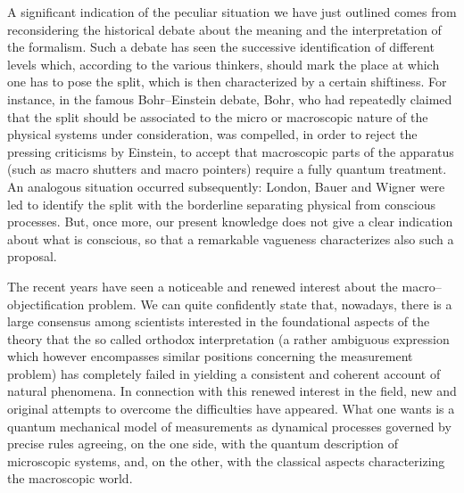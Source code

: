 \documentclass[10pt,a4paper]{article}
\begin{document}
A significant  indication of the peculiar situation we have just
outlined comes from reconsidering the historical debate about the
meaning and the interpretation of the formalism. Such a debate has
seen the successive identification of different levels which,
according to the various thinkers, should mark the place at which
one has to pose the split, which is then characterized by a
certain shiftiness.  For instance, in the famous Bohr--Einstein
debate, Bohr, who had repeatedly claimed that the split should be
associated to the micro or macroscopic nature of the physical
systems under consideration, was compelled, in order to reject the
pressing criticisms by Einstein,  to accept that macroscopic parts
of the apparatus (such as macro shutters and macro pointers)
require a fully quantum treatment. An analogous situation occurred
subsequently: London, Bauer and Wigner were led to identify the
split with the borderline separating physical from conscious
processes. But, once more, our present knowledge does not give a
clear indication about what is conscious, so that a remarkable
vagueness characterizes also such a proposal.

The recent years have seen a noticeable and renewed interest about
the macro--objectification problem. We can quite confidently state
that, nowadays, there is a large consensus among scientists
interested in the foundational aspects of the theory that the so
called orthodox interpretation (a rather ambiguous expression
which however encompasses similar positions concerning the
measurement problem) has completely failed in yielding a
consistent and coherent account of natural phenomena. In
connection with this renewed interest in the field, new and
original attempts to overcome the difficulties have appeared. What
one wants is a quantum mechanical model of measurements as
dynamical processes governed by precise rules agreeing, on the one
side, with the quantum description of microscopic systems, and, on
the other, with the classical aspects characterizing the
macroscopic world.
\end{document}

